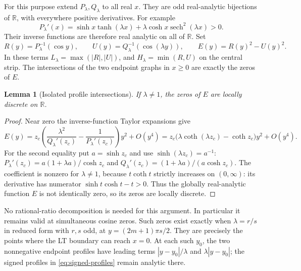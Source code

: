 \documentclass[11pt]{article}
\numberwithin{equation}{section}
\newtheorem{lemma}[theorem]{Lemma}
\theoremstyle{definition}
\newcommand{\R}{\mathbb R}
\begin{document}
For this purpose extend $P_\lambda,Q_\lambda$ to all real $x$.
They are odd real-analytic bijections of $\R$, with everywhere
positive derivatives.  For example
\[
 P_\lambda'(x)=\sinh x\tanh(\lambda x)
                  +\lambda\cosh x\operatorname{sech}^2(\lambda x)>0.
\]
Their inverse functions are therefore real analytic on all of $\R$.
Set
\begin{equation}\label{eq:signed-profiles}
 R(y)=P_\lambda^{-1}(\cos y),\qquad
 U(y)=Q_\lambda^{-1}(\cos(\lambda y)),\qquad
 E(y)=R(y)^2-U(y)^2.
\end{equation}
In these terms $L_\lambda=\max(|R|,|U|)$, and
$H_\lambda=\min(R,U)$ on the central strip.
The intersections of the two endpoint graphs in $x\ge0$ are
exactly the zeros of $E$.

\begin{lemma}[Isolated profile intersections]\label{lem:profile-discrete}
If $\lambda\ne1$, the zeros of $E$ are locally discrete on $\R$.
\end{lemma}
\begin{proof}
Near zero the inverse-function Taylor expansions give
\[
 E(y)=z_c\left(\frac{\lambda^2}{Q_\lambda'(z_c)}
                      -\frac1{P_\lambda'(z_c)}\right)y^2+O(y^4)
     =z_c\bigl(\lambda\coth(\lambda z_c)-\coth z_c\bigr)y^2
       +O(y^4).
\]
For the second equality put $a=\sinh z_c$ and use
$\sinh(\lambda z_c)=a^{-1}$:
$P_\lambda'(z_c)=a(1+\lambda a)/\cosh z_c$ and
$Q_\lambda'(z_c)=(1+\lambda a)/(a\cosh z_c)$.
The coefficient is nonzero for $\lambda\ne1$, because $t\coth t$
strictly increases on $(0,\infty)$:
its derivative has numerator $\sinh t\cosh t-t>0$.
Thus the globally real-analytic function $E$ is not identically
zero, so its zeros are locally discrete.
\end{proof}

No rational-ratio decomposition is needed for this argument.
In particular it remains valid at simultaneous cosine zeros.
Such zeros exist exactly when $\lambda=r/s$ in reduced form
with $r,s$ odd, at $y=(2m+1)\pi s/2$.  They are precisely the
points where the LT boundary can reach $x=0$.  At each such $y_0$,
the two nonnegative endpoint profiles have leading terms
$|y-y_0|/\lambda$ and $\lambda|y-y_0|$; the signed profiles in
\eqref{eq:signed-profiles} remain analytic there.
\end{document}
